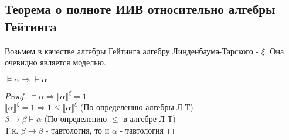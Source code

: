 \subsection{Теорема о полноте ИИВ относительно алгебры Гейтингa}
\label{sec-5-6}
Возьмем в качестве алгебры Гейтинга алгебру Линденбаума-Тарского - $\xi$. Она очевидно является моделью. 
\begin{theorem}
$\vDash \alpha \Rightarrow \vdash \alpha$
\end{theorem}
\begin{proof}
$\vDash \alpha \Rightarrow \llbracket \alpha \rrbracket ^ {\xi} = 1$\\
$\llbracket \alpha \rrbracket ^ {\xi} = 1 \Rightarrow 1 \leq \llbracket \alpha \rrbracket ^ {\xi}$ (По определению алгебры Л-Т)\\
$\beta \rightarrow \beta \vdash \alpha$ (По определению $\leq$ в алгебре Л-Т)\\
Т.к. $\beta \rightarrow \beta$ - тавтология, то и $\alpha$ - тавтология
\end{proof}
